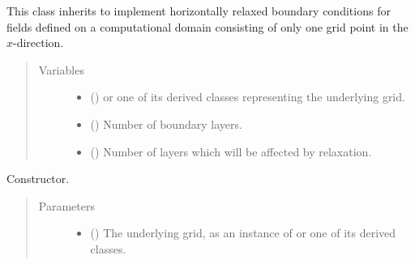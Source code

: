 \documentclass[letterpaper,10pt,english]{sphinxmanual}
\begin{document}
\begin{fulllineitems}
\label{\detokenize{api:dycore.horizontal_boundary_relaxed.RelaxedYZ}}
This class inherits  to implement horizontally relaxed boundary conditions for fields defined
on a computational domain consisting of only one grid point in the \(x\)-direction.
\begin{quote}\begin{description}
\item[{Variables}] \leavevmode\begin{itemize}
\item {} 
 () \textendash{}  or one of its derived classes representing the underlying grid.

\item {} 
{\hyperref[\detokenize{api:dycore.prognostic_isentropic.PrognosticIsentropic.nb}]{}} () \textendash{} Number of boundary layers.

\item {} 
 () \textendash{} Number of layers which will be affected by relaxation.

\end{itemize}

\end{description}\end{quote}

\begin{fulllineitems}
\label{\detokenize{api:dycore.horizontal_boundary_relaxed.RelaxedYZ.__init__}}
Constructor.
\begin{quote}\begin{description}
\item[{Parameters}] \leavevmode\begin{itemize}
\item {} 
 () \textendash{} The underlying grid, as an instance of {\hyperref[\detokenize{api:grids.grid_xyz.GridXYZ}]{}} or one of its derived classes.


\end{itemize}
\end{description}
\end{quote}
\end{fulllineitems}
\end{fulllineitems}
\end{document}
